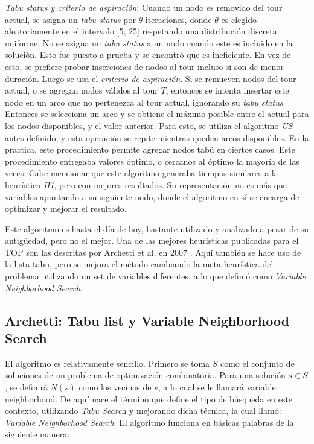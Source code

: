 \documentclass[letter, 10pt]{article}
\begin{document}
\textit{Tabu status y criterio de aspiración}: Cuando un nodo es removido del tour actual, se asigna un \textit{tabu status} por $\theta$ iteraciones, donde $\theta$ es elegido aleatoriamente en el intervalo [5, 25] respetando una distribución discreta uniforme. No se asigna un \textit{tabu status} a un nodo cuando este es incluido en la solución. Esto fue puesto a prueba y se encontró que es ineficiente. En vez de esto, se prefiere probar inserciones de nodos al tour incluso si son de menor duración. Luego se usa el \textit{criterio de aspiración}. Si se remueven nodos del tour actual, o se agregan nodos válidos al tour $T$, entonces se intenta insertar este nodo en un arco que no pertenezca al tour actual, ignorando su \textit{tabu status}. Entonces se selecciona un arco y se obtiene el máximo posible entre el actual para los nodos disponibles, y el valor anterior. Para esto, se utiliza el algoritmo \textit{US} antes definido, y esta operación se repite mientras queden arcos disponibles. En la practica, este procedimiento permite agregar nodos tabú en ciertos casos. Este procedimiento entregaba valores óptimo, o cercanos al óptimo la mayoría de las veces. Cabe mencionar que este algoritmo generaba tiempos similares a la heurística \textit{H1}, pero con mejores resultados. Su representación no es más que variables apuntando a su siguiente nodo, donde el algoritmo en sí se encarga de optimizar y mejorar el resultado.

Este algoritmo es hasta el día de hoy, bastante utilizado y analizado a pesar de su antigüedad, pero no el mejor. Una de las mejores heurísticas publicadas para el TOP son las descritas por Archetti et al. en 2007 \cite{Archetti2007}. Aquí también se hace uso de la lista tabu, pero se mejora el método cambiando la meta-heurística del problema utilizando un set de variables diferentes, a lo que definió como \textit{Variable Neighborhood Search}.

\subsection{Archetti: Tabu list y Variable Neighborhood Search}
El algoritmo es relativamente sencillo. Primero se toma $S$ como el conjunto de soluciones de un problema de optimización combinatoria. Para una solución $s \in S$, se definirá $N(s)$ como los vecinos de $s$, a lo cual se le llamará variable neighborhood. De aquí nace el término que define el tipo de búsqueda en este contexto, utilizando \textit{Tabu Searc}h y mejorando dicha técnica, la cual llamó: \textit{Variable Neighborhood Search}. El algoritmo funciona en básicas palabras de la siguiente manera: 
\end{document}
